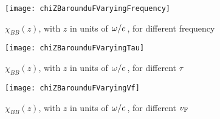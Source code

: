\documentclass[../main.tex]{subfiles}
\begin{document}
	\begin{figure}[htp]
		\centering
		\texttt{[image: chiZBarounduFVaryingFrequency]}
		\caption{$\chi_{BB}(z)$, with $z$ in units of $\flatfrac{\omega}{c}$, for different frequency} \label{fig:ime:frequency}
	\end{figure}

	\begin{figure}[htp]
		\centering
		\texttt{[image: chiZBarounduFVaryingTau]}
		\caption{$\chi_{BB}(z)$, with $z$ in units of $\flatfrac{\omega}{c}$, for different $\tau$} \label{fig:ime:tau}
	\end{figure}

	\begin{figure}[htp]
		\centering
		\texttt{[image: chiZBarounduFVaryingVf]}
		\caption{$\chi_{BB}(z)$, with $z$ in units of $\flatfrac{\omega}{c}$, for different $v_{\mathrm{F}}$} \label{fig:ime:vf}
	\end{figure}
\end{document}
